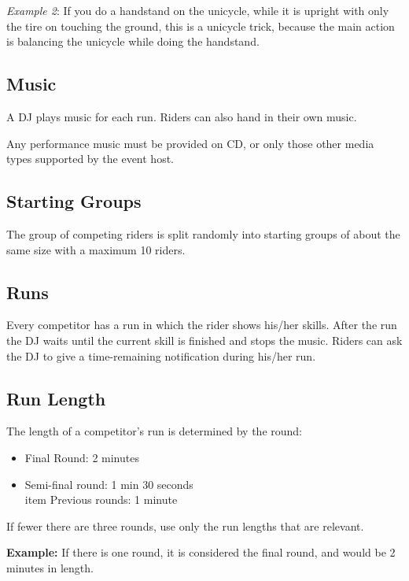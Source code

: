 \emph{Example 2}: If you do a handstand on the unicycle, while it is upright with only the tire on touching the ground, this is a unicycle trick, because the main action is balancing the unicycle while doing the handstand.

\subsection{Music}

A DJ plays music for each run.
Riders can also hand in their own music.

Any performance music must be provided on CD, or only those other media types supported by the event host.

\subsection{Starting Groups}
The group of competing riders is split randomly into starting groups of about the same size with a maximum 10 riders.

\subsection{Runs}

Every competitor has a run in which the rider shows his/her skills.
After the run the DJ waits until the current skill is finished and stops the music.
Riders can ask the DJ to give a time-remaining notification during his/her run.

\subsection{Run Length}

The length of a competitor's run is determined by the round:
\begin{itemize}
\item Final Round: 2 minutes \\
\item Semi-final round: 1 min 30 seconds \\
item Previous rounds: 1 minute \\
\end{itemize}

If fewer there are three rounds, use only the run lengths that are relevant.

\textbf{Example:} If there is one round, it is considered the final round, and would be 2 minutes in length.


